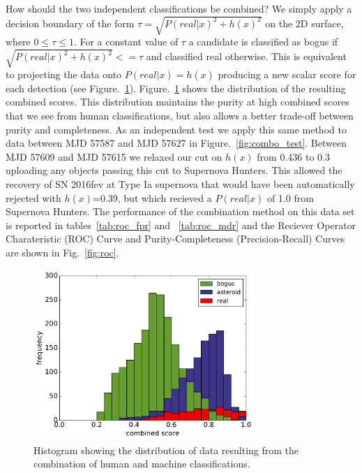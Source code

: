 \documentclass[a4paper,fleqn,usenatbib]{mnras}
\begin{document}
How should the two independent classifications be combined?  We simply apply a decision boundary of the form $\tau = \sqrt{P(real|x)^2 + h(x)^2}$ on the 2D surface, where $0\leq\tau\leq1$.  For a constant value of $\tau$ a candidate is classified as bogus if $\sqrt{P(real|x)^2 + h(x)^2} <= \tau$ and classified real otherwise.  This is equivalent to projecting the data onto $P(real|x)=h(x)$ producing a new scalar score for each detection (see Figure.~\ref{fig:combo_hist}).  Figure.~\ref{fig:combo_hist} shows the distribution of the resulting combined scores.  This distribution maintains the purity at high combined scores that we see from human classifications, but also allows a better trade-off between purity and completeness.  As an independent test we apply this same method to data between MJD 57587 and MJD 57627 in
Figure.~\ref{fig:combo_test}.  Between MJD 57609 and MJD 57615 we relaxed our cut on $h(x)$ from 0.436 to 0.3 uploading any objects passing this cut to Supernova Hunters.  This allowed the recovery of SN 2016fev at Type Ia supernova that would have been automatically rejected with $h(x)$=0.39, but which recieved a $P(real|x)$ of 1.0 from Supernova Hunters.  The performance of the combination method on this data set is reported in tables~\ref{tab:roc_fpr} and ~\ref{tab:roc_mdr} and the Reciever Operator Charateristic (ROC) Curve and Purity-Completeness (Precision-Recall) Curves are shown in Fig.~\ref{fig:roc}.

\begin{figure}
   \includegraphics[width=84mm]{figs/combo_hist.pdf}
   \caption{Histogram showing the distribution of data resulting from the combination of human and machine classifications.}
   \label{fig:combo_hist} 
\end{figure}
\end{document}

